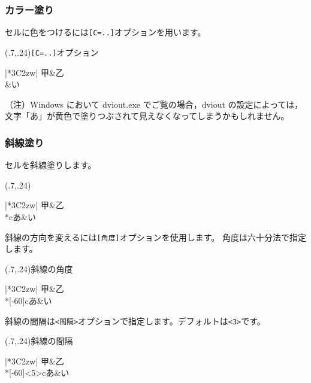 \subsubsection{カラー塗り}
セルに色をつけるには\texttt{[C=..]}オプションを用います。

\begin{showEx}(.7,.24){\texttt{[C=..]}オプション}
\begin{Hyou}{|*3{C{2zw}|}}\hline
  甲&乙\\\hline
  &い\\\hline
\end{Hyou}
\end{showEx}

（注）Windows において dviout.exe でご覧の場合，dviout の設定によっては，
文字「あ」が黄色で塗りつぶされて見えなくなってしまうかもしれません。

\subsubsection{斜線塗り}
セルを斜線塗りします。

\begin{showEx}(.7,.24){}
\begin{Hyou}{|*3{C{2zw}|}}\hline
  甲&乙\\\hline
  \EMcell**{c}{あ}&い\\\hline
\end{Hyou}
\end{showEx}

斜線の方向を変えるには\verb+[角度]+オプションを使用します。
角度は六十分法で指定します。

\begin{showEx}(.7,.24){斜線の角度}
\begin{Hyou}{|*3{C{2zw}|}}\hline
  甲&乙\\\hline
  \EMcell**[-60]{c}{あ}&い\\\hline
\end{Hyou}
\end{showEx}

斜線の間隔は\verb+<間隔>+オプションで指定します。デフォルトは\verb+<3>+です。

\begin{showEx}(.7,.24){斜線の間隔}
\begin{Hyou}{|*3{C{2zw}|}}\hline
  甲&乙\\\hline
  \EMcell**[-60]<5>{c}{あ}&い\\\hline
\end{Hyou}
\end{showEx}

